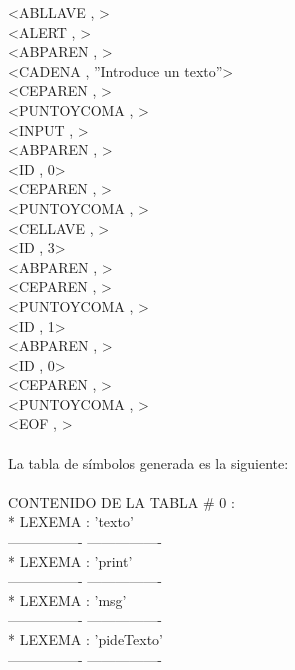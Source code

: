 \documentclass{article}
\begin{document}
\begin{flushleft}
<ABLLAVE , >\\
<ALERT , >\\
<ABPAREN , >\\
<CADENA , ''Introduce un texto''>\\
<CEPAREN , >\\
<PUNTOYCOMA , >\\
<INPUT , >\\
<ABPAREN , >\\
<ID , 0>\\
<CEPAREN , >\\
<PUNTOYCOMA , >\\
<CELLAVE , >\\
<ID , 3>\\
<ABPAREN , >\\
<CEPAREN , >\\
<PUNTOYCOMA , >\\
<ID , 1>\\
<ABPAREN , >\\
<ID , 0>\\
<CEPAREN , >\\
<PUNTOYCOMA , >\\
<EOF , >\\
\quad\\
La tabla de símbolos generada es la siguiente:\\
\quad\\
CONTENIDO DE LA TABLA \# 0 :\\

*	LEXEMA : 'texto'\\
---------------- ----------------\\
*	LEXEMA : 'print'\\
---------------- ----------------\\
*	LEXEMA : 'msg'\\
---------------- ----------------\\
*	LEXEMA : 'pideTexto'\\
---------------- ----------------\\
\end{flushleft}
\end{document}
